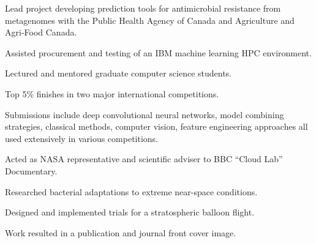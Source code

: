 \documentclass[]{Finlay_Maguire_CV}
\begin{document}
\begin{minipage}[t]{0.66\textwidth}
\begin{tightemize}
\item Lead project developing prediction tools for antimicrobial resistance from metagenomes with the Public Health Agency of Canada and Agriculture and Agri-Food Canada.
\item Assisted procurement and testing of an IBM machine learning HPC environment.
\item Lectured and mentored graduate computer science students.
\end{tightemize}

\begin{tightemize}
\item Top 5\% finishes in two major international competitions.
\item Submissions include deep convolutional neural networks, model combining strategies, classical methods, computer vision, feature engineering approaches all used extensively in various competitions.
\end{tightemize}
    \vspace{-0.3cm}

\sectionsep
{}
\begin{tightemize}
\item Acted as NASA representative and scientific adviser to BBC ``Cloud Lab'' Documentary.
\item Researched bacterial adaptations to extreme near-space conditions.
\item Designed and implemented trials for a stratospheric balloon flight.
\item Work resulted in a publication and journal front cover image.
\end{tightemize}


    \vspace{-0.3cm}


\end{minipage}
\end{document}
